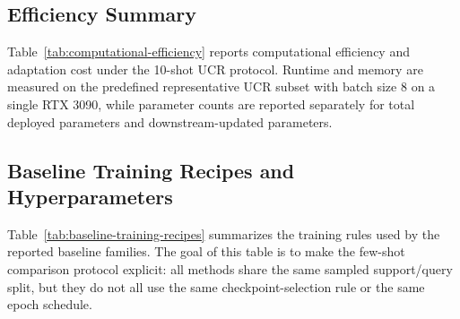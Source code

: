 \documentclass{article}
\begin{document}


\subsection{Efficiency Summary}
\label{app:efficiency-summary}

Table~\ref{tab:computational-efficiency} reports computational efficiency and adaptation cost under the 10-shot UCR protocol. Runtime and memory are measured on the predefined representative UCR subset with batch size 8 on a single RTX 3090, while parameter counts are reported separately for total deployed parameters and downstream-updated parameters.



\subsection{Baseline Training Recipes and Hyperparameters}
\label{app:baseline-details}

Table~\ref{tab:baseline-training-recipes} summarizes the training rules used by the reported baseline families.
The goal of this table is to make the few-shot comparison protocol explicit: all methods share the same sampled support/query split, but they do not all use the same checkpoint-selection rule or the same epoch schedule.
\end{document}
